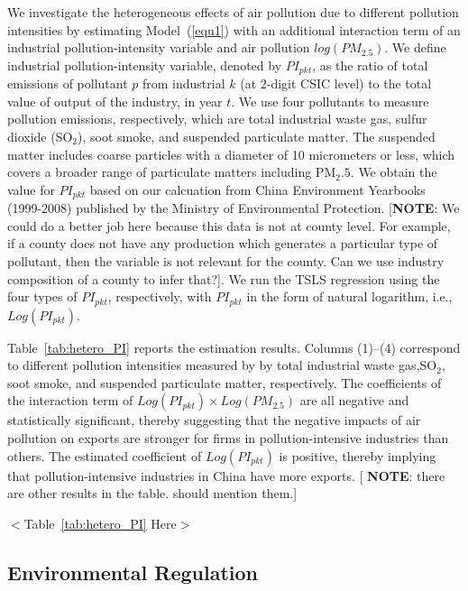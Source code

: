 \documentclass[12pt]{article}
\begin{document}
We investigate the heterogeneous effects of air pollution due to different
pollution intensities by estimating Model~(\ref{equ1}) with an additional
interaction term of an industrial pollution-intensity variable and air
pollution $log(PM_{2.5})$. We define industrial pollution-intensity
variable, denoted by $PI_{pkt}$, as the ratio of total emissions of
pollutant $p$ from industrial $k$ (at 2-digit CSIC level) to the total value
of output of the industry, in year $t$. We use four pollutants to measure
pollution emissions, respectively, which are total industrial waste gas,
sulfur dioxide (SO$_{2}$), soot smoke, and suspended particulate matter. The
suspended matter includes coarse particles with a diameter of 10 micrometers
or less, which covers a broader range of particulate matters including $%
\mathrm{PM_{2}.5}$. We obtain the value for $PI_{pkt}$ based on our
calcuation from China Environment Yearbooks (1999-2008) published by the
Ministry of Environmental Protection. [\textbf{NOTE}: We could do a better
job here because this data is not at county level. For example, if a county
does not have any production which generates a particular type of pollutant,
then the variable is not relevant for the county. Can we use industry
composition of a county to infer that?]. We run the TSLS regression using
the four types of $PI_{pkt}$, respectively, with $PI_{pkt}$ in the form of
natural logarithm, i.e., $Log(PI_{pkt})$.

Table~\ref{tab:hetero_PI} reports the estimation results. Columns (1)--(4)
correspond to different pollution intensities measured by by total
industrial waste gas,\text{ }SO$_{2}$, soot smoke, and suspended particulate
matter, respectively. The coefficients of the interaction term of $%
Log(PI_{pkt})\times Log(PM_{2.5})$ are all negative and statistically
significant, thereby suggesting that the negative impacts of air pollution
on exports are stronger for firms in pollution-intensive industries than
others. The estimated coefficient of $Log(PI_{pkt})$ is positive, thereby
implying that pollution-intensive industries in China have more exports. [%
\textbf{NOTE}: there are other results in the table. should mention them.]

\begin{center}
$<$Table~\ref{tab:hetero_PI} Here$>$
\end{center}

\subsection{Environmental Regulation}
\end{document}
